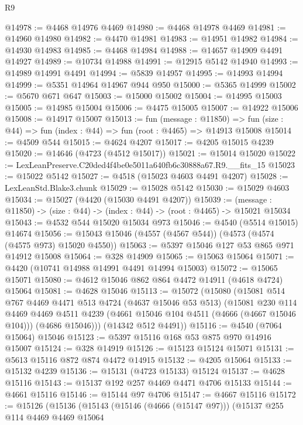 \begin{lexlean}{R9}
\begin{coremodule}
@14978 := @4468 @14976 @4469
@14980 := @4468 @14978 @4469
@14981 := @14960 @14980
@14982 := @4470 @14981
@14983 := @14951 @14982
@14984 := @14930 @14983
@14985 := @4468 @14984
@14988 := @14657 @14909 @4491 @14927
@14989 := @10734 @14988
@14991 := @12915 @5142 @14940
@14993 := @14989 @14991 @4491
@14994 := @5839 @14957
@14995 := @14993 @14994
@14999 := @5351 @14964 @14967 @944 @950
@15000 := @5365 @14999
@15002 := @5670 @671 @647
@15003 := @15000 @15002
@15004 := @14995 @15003
@15005 := @14985 @15004
@15006 := @4475 @15005
@15007 := @14922 @15006
@15008 := @14917 @15007
@15013 := fun (message : @11850) =>
  fun (size : @44) => fun (index : @44) => fun (root : @4465) => @14913 @15008
@15014 := @4509 @544
@15015 := @4624 @4207
@15017 := @4205 @15015 @4239
@15020 := @14646 (@4723 (@4512 @15017))
@15021 := @15014 @15020
@15022 := LexLeanPreserve.C20ded4f4be0e5011a640fb6c30888a67.R9.__fits_15
@15023 := @15022 @5142
@15027 := @4518 (@15023 @4603 @4491 @4207)
@15028 := LexLeanStd.Blake3.chunk
@15029 := @15028 @5142
@15030 := @15029 @4603
@15034 := @15027 (@4420 (@15030 @4491 @4207))
@15039 := (message : @11850) -> (size : @44) -> (index : @44) -> (root : @4465) -> @15021 @15034
@15043 := @4532 @544 @15020 @15034 @973
@15046 := @4540 (@5514 @15015) @14674
@15056 := @15043 @15046 (@4557 (@4567 @544)) (@4573 (@4574 (@4575 @973) @15020 @4550))
@15063 := @5397 @15046 @127 @53 @865 @971 @14912 @15008
@15064 := @328 @14909
@15065 := @15063 @15064
@15071 := @4420 (@10741 @14988 @14991 @4491 @14994 @15003)
@15072 := @15065 @15071
@15080 := @4612 @15046 @862 @864 @4472 @14911 (@4618 @4724) @15064
@15081 := @4628 @15046
@15113 := @15072
    (@15080
      (@15081
        @514
        @767
        @4469
        @4471
        @513
        @4724
        (@4637 @15046 @53 @513)
        (@15081
          @230
          @114
          @4469
          @4469
          @4511
          @4239
          (@4661 @15046 @104 @4511 (@4666 (@4667 @15046 @104)))
          (@4686 @15046)))
      (@14342 @512 @4491))
@15116 := @4540 (@7064 @15064) @15046
@15123 := @5397 @15116 @168 @53 @875 @970 @14916 @15007
@15124 := @328 @14919
@15126 := @15123 @15124 @15071
@15131 := @5613 @15116 @872 @874 @4472 @14915
@15132 := @4205 @15064
@15133 := @15132 @4239
@15136 := @15131 (@4723 @15133) @15124
@15137 := @4628 @15116
@15143 := @15137 @192 @257 @4469 @4471 @4706 @15133
@15144 := @4661 @15116
@15146 := @15144 @97 @4706
@15147 := @4667 @15116
@15172 := @15126
    (@15136
      (@15143
        (@15146 (@4666 (@15147 @97)))
        (@15137
          @255
          @114
          @4469
          @4469
          @15064

\end{coremodule}
\end{lexlean}
